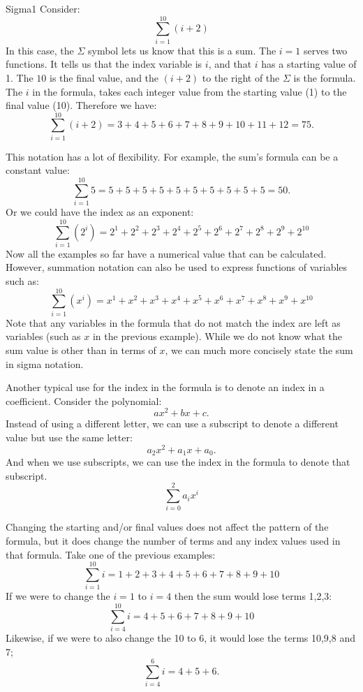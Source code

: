\begin {example}{Sigma1}
Consider:
\[\sum _{i=1}^{10}(i+2)\]
In this case, the $\Sigma$ symbol lets us know that this is a sum.  The $i=1$ serves two functions.  It tells us that the index variable is $i$, and that $i$ has a starting value of 1. The $10$ is the final value, and the $(i+2)$ to the right of the $\Sigma$ is the formula. The $i$ in the formula, takes each integer value from the starting value (1) to the final value (10).  
Therefore we have:
\[\sum _{i=1}^{10}(i+2) = 3 + 4 + 5 + 6 + 7 + 8 + 9 + 10 + 11 + 12=75.\]
\end {example}

This notation has a lot of flexibility. For example, the sum's formula can be a constant value:
\[\sum _{i=1}^{10}5 = 5 + 5 + 5 + 5 + 5 + 5 + 5 + 5 + 5 + 5 = 50.\]
Or we could have the index as an exponent:
\[\sum _{i=1}^{10}(2^i) = 2^1 + 2^2 + 2^3 + 2^4 + 2^5 + 2^6+ 2^7+ 2^8+ 2^9+ 2^{10} \]
Now all the examples so far have a numerical value that can be calculated.  However, summation notation can also be used to express functions of variables such as:  
\[\sum _{i=1}^{10}(x^i)= x^1 + x^2 + x^3 + x^4 + x^5 + x^6+ x^7+ x^8+ x^9+ x^{10} \]
Note that any variables in the formula that do not match the index are left as variables (such as $x$ in the previous example).  
While we do not know what the sum value is other than in terms of $x$, we can much more concisely state the sum in sigma notation.

Another typical use for the index in the formula is to denote an index in a coefficient.  Consider the polynomial:
\[ax^2 + bx + c.\]
Instead of using a different letter, we can use a subscript to denote a different value but use the same letter:
\[a_2x^2 + a_1x + a_0.\]
And when we use subscripts, we can use the index in the formula to denote that subscript.
\[\sum_{i=0}^{2}a_ix^i\]

Changing the starting and/or final values does not affect the pattern of the formula, but it does change the number of terms and any index values used in that formula.  Take one of the previous examples:
\[\sum _{i=1}^{10}i = 1 + 2 + 3 + 4 + 5 + 6 + 7 + 8 + 9 + 10\]
If we were to change the $i=1$ to $i=4$ then the sum would lose terms 1,2,3:
\[\sum _{i=4}^{10}i = 4 + 5 + 6 + 7 + 8 + 9 + 10\]
Likewise, if we were to also change the 10 to 6, it would lose the terms 10,9,8 and 7;
\[\sum _{i=4}^{6}i = 4 + 5 + 6.\]

